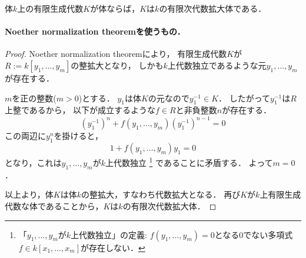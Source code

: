 
\begin{Lemma}[Zariskiの補題]
体$k$上の有限生成代数$K$が体ならば，$K$は$k$の有限次代数拡大体である．
\end{Lemma}

\paragraph{Noether normalization theoremを使うもの．}
\begin{proof}
    Noether normalization theoremにより，
    有限生成代数$K$が$R:=k[y_1, \dots, y_m]$の整拡大となり，
    しかも$k$上代数独立であるような元$y_1, \dots, y_m$が存在する．
    
    $m$を正の整数($m>0$)とする．
    $y_1$は体$K$の元なので$y_1^{-1} \in K$．
    したがって$y_1^{-1}$は$R$上整であるから，
    以下が成立するような$f \in R$と非負整数$n$が存在する．
    \[ (y_1^{-1})^n+f(y_1, \dots, y_m) (y_1^{-1})^{n-1}=0 \]
    この両辺に$y_1^{n}$を掛けると，
    \[ 1+f(y_1, \dots, y_m) y_1=0 \]
    となり，これは$y_1, \dots, y_m$が$k$上代数独立
    \footnote
    {
        「$y_1, \dots, y_m$が$k$上代数独立」の定義:
        $f(y_1, \dots, y_m)=0$となる0でない多項式$f \in k[x_1, \dots, x_m]$が存在しない．
    } 
    であることに矛盾する．
    よって$m=0$．

    以上より，体$K$は体$k$の整拡大，すなわち代数拡大となる．
    再び$K$が$k$上有限生成代数な体であることから，$K$は$k$の有限次代数拡大体．
\end{proof}

